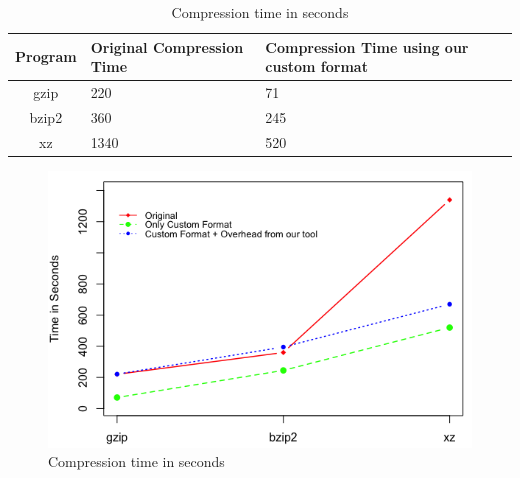\begin{table}[H]
	\centering
	\begin{tabular}{c | p{} | p{1.5cm}} 
	Program & {Original Compression Time} & {Compression Time using our custom format} \\
	\hline
	gzip & 220  & 71 \\
	bzip2 & 360  & 245\\
	xz & 1340 & 520 \\
	\end{tabular}
	\caption{Compression time in seconds}
	\label{tab:comptime}
\end{table}
\begin{figure}
	\centering
	\includegraphics[width=\textwidth]{plots/time}
	\caption{Compression time in seconds}
	\label{fig:comptime}
\end{figure}
